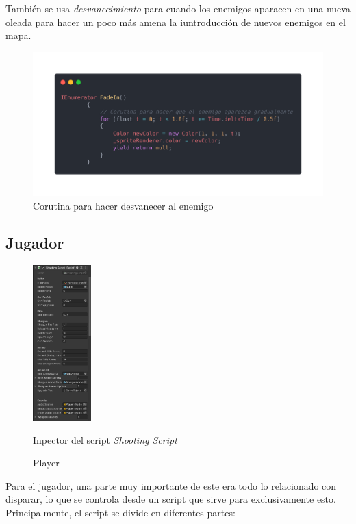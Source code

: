 \documentclass[12pt]{article}
\begin{document}
        También se usa \textit{desvanecimiento} para cuando los enemigos aparacen en una nueva oleada para hacer un poco más amena la iuntroducción de nuevos enemigos en el mapa.
        \begin{figure}[H]
            \centering
            \includegraphics[width=\textwidth]{Images/Menuprincipal/fadein.png}
            \caption{Corutina para hacer desvanecer al enemigo}
        \end{figure}
    \subsection{Jugador}

    \begin{figure}
        \begin{center}
            \includegraphics[width=0.2\textwidth]{Images/ShootyMacShooty/rifleinspector.png}
            \caption*{Inpector del script \textit{Shooting Script}}
        \end{center}
        \caption{Player}
    
    \end{figure}        

        Para el jugador, una parte muy importante de este era todo lo relacionado con disparar, lo que se controla desde un script que sirve para exclusivamente esto. Principalmente, el script se divide en diferentes partes:
\end{document}
